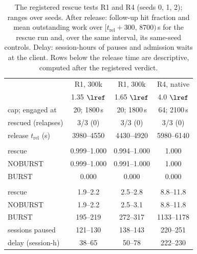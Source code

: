 \begin{table}[t]
\centering\footnotesize
\caption{The registered rescue tests R1 and R4 (seeds 0, 1, 2); ranges over seeds. After release: follow-up hit fraction and mean
outstanding work over $[t_{\mathrm{rel}}+300,\,8700)$\,s for the rescue run and, over the same interval, its same-seed controls.
Delay: session-hours of pauses and admission waits at the client. Rows below the release time are descriptive, computed after the
registered verdict.}\label{tab:rescue}
\setlength{\tabcolsep}{3pt}
\begin{tabular}{@{}>{\raggedright\arraybackslash}p{2.3cm} c c c@{}}
\toprule
 & R1, 300k & R1, 300k & R4, native\\
 & 1.35 $\lref$ & 1.65 $\lref$ & 4.0 $\lref$\\
\midrule
cap; engaged at & 20; 1800\,s & 20; 1800\,s & 64; 2100\,s\\
rescued (relapses) & 3/3 (0) & 3/3 (0) & 3/3 (0)\\
release $t_{\mathrm{rel}}$ (s) & 3980--4550 & 4430--4920 & 5980--6140\\
\addlinespace
\multicolumn{4}{@{}l}{\emph{after release: follow-up hit fraction}}\\
\quad rescue & 0.999--1.000 & 0.994--1.000 & 1.000\\
\quad NOBURST & 0.999--1.000 & 0.991--1.000 & 1.000\\
\quad BURST & 0.000 & 0.000 & 0.000\\
\multicolumn{4}{@{}l}{\emph{after release: mean outstanding work}}\\
\quad rescue & 1.9--2.2 & 2.5--2.8 & 8.8--11.8\\
\quad NOBURST & 1.9--2.2 & 2.5--3.1 & 8.8--11.8\\
\quad BURST & 195--219 & 272--317 & 1133--1178\\
\addlinespace
sessions paused & 121--130 & 138--143 & 220--251\\
delay (session-h) & 38--65 & 50--78 & 222--230\\
\bottomrule
\end{tabular}
\end{table}

